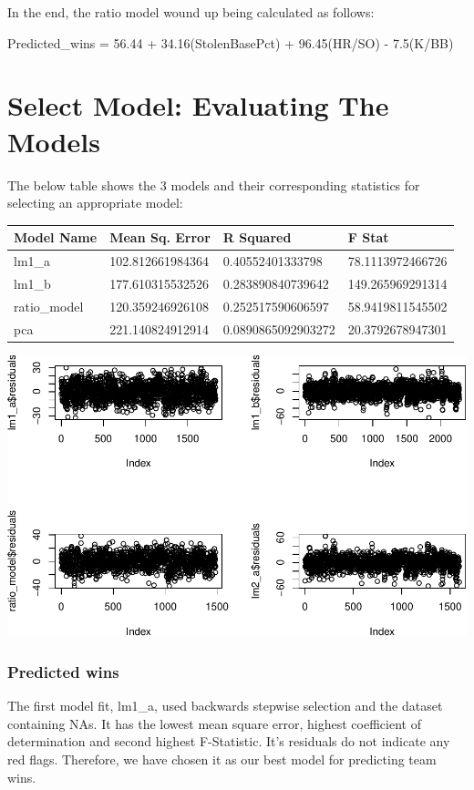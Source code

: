 \documentclass[]{article}
\begin{document}
In the end, the ratio model wound up being calculated as follows:

Predicted\_wins = 56.44 + 34.16(StolenBasePct) + 96.45(HR/SO) -
7.5(K/BB)

\section{Select Model: Evaluating The
Models}\label{select-model-evaluating-the-models}

The below table shows the 3 models and their corresponding statistics
for selecting an appropriate model:

\begin{longtable}[c]{@{}llll@{}}
\toprule
Model Name & Mean Sq. Error & R Squared & F Stat\tabularnewline
\midrule
\endhead
lm1\_a & 102.812661984364 & 0.40552401333798 &
78.1113972466726\tabularnewline
lm1\_b & 177.610315532526 & 0.283890840739642 &
149.265969291314\tabularnewline
ratio\_model & 120.359246926108 & 0.252517590606597 &
58.9419811545502\tabularnewline
pca & 221.140824912914 & 0.0890865092903272 &
20.3792678947301\tabularnewline
\bottomrule
\end{longtable}

\includegraphics{DATA621-Homework-1_files/figure-latex/unnamed-chunk-27-1.pdf}

\subsubsection{Predicted wins}\label{predicted-wins}

The first model fit, lm1\_a, used backwards stepwise selection and the
dataset containing NAs. It has the lowest mean square error, highest
coefficient of determination and second highest F-Statistic. It's
residuals do not indicate any red flags. Therefore, we have chosen it as
our best model for predicting team wins.
\end{document}
